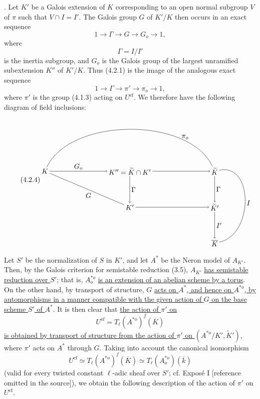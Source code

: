 \medskip
{}. Let $K'$ be a Galois extension of $K$ corresponding to an open
normal subgroup $V$ of $\pi$ such that $V\cap I=I'$.  The Galois group
$G$ of $K'/K$ then occurs in an exact sequence
\begin{equation}\tag{4.2.1}
 1\longrightarrow\Gamma\longrightarrow G\longrightarrow G_o
 \longrightarrow1,
\end{equation}
where
\begin{equation}\tag{4.2.2}
 \Gamma=I/I'
\end{equation}
is the inertia subgroup, and $G_o$ is the Galois group of the largest
unramified subextension $K''$ of $K'/K$.  Thus (4.2.1) is the image of the
analogous exact sequence
\begin{equation}\tag{4.2.3}
 1\longrightarrow\Gamma\longrightarrow\pi'\longrightarrow\pi_o
 \longrightarrow1,
\end{equation}
where $\pi'$ is the group (4.1.3) acting on $U^{\mathrm{ef}}$.  We
therefore have the following diagram of field inclusions:
\begin{equation}\tag{4.2.4}
\begin{tikzpicture}[baseline=(current bounding box.center),
  every node/.style={inner sep=2pt}]
  \node (K) at (0,0) {$K$};
  \node (Ktwo) at (4.25,0) {$K''=\widetilde K\cap K'$};
  \node (Kt) at (8.5,0) {$\widetilde K$};
  \node (Kp) at (4.25,-1.8) {$K'$};
  \node (Ktp) at (8.5,-1.8) {$\widetilde K'$};
  \node (Kb) at (8.5,-3.6) {$\overline K$};
  \draw[->] (K) -- node[above] {$G_o$} (Ktwo);
  \draw[->] (Ktwo) -- (Kt);
  \draw[->] (Ktwo) -- node[right] {$\Gamma$} (Kp);
  \draw[->] (Kp) -- (Ktp);
  \draw[->] (Kt) -- node[right] {$\Gamma$} (Ktp);
  \draw[->] (Ktp) -- node[right] {$I'$} (Kb);
  \draw[-] (K) -- node[below left,pos=.58] {$G$} (Kp);
  \draw[-] (K) to[out=65,in=115,looseness=.85]
    node[above,pos=.78] {$\pi_o$} (Kt);
  \draw[-] (Kt) to[out=12,in=12,looseness=1.25]
    node[right,pos=.52] {$I$} (Kb);
\end{tikzpicture}
\end{equation}

Let $S'$ be the normalization of $S$ in $K'$, and let $A^*$ be the
Neron model of $A_{K'}$.  Then, by the Galois criterion for semistable
reduction (3.5), $A_{K'}$ \underline{has semistable reduction over
$S'$}; that is, $A^{*o}_o$ \underline{is an extension of an abelian
scheme by a torus}.  On the other hand, by transport of structure, $G$
\underline{acts on $A^*$, and hence on $A^{*o}$, by automorphisms in a
manner compatible with the given action of $G$ on the base scheme $S'$
of $A^*$}.  It is then clear that \underline{the action of $\pi'$ on}
\[
 U^{\mathrm{ef}}=T_\ell(A^{*o})^f(\overline K)
\]
\underline{is obtained by transport of structure from the action of
$\pi'$ on $(A^{*o}/K',\widetilde K')$}, where $\pi'$ acts on $A^*$
through $G$.  Taking into account the canonical isomorphism
\begin{equation}\tag{4.2.6}
 U^{\mathrm{ef}}\simeq T_\ell(A^{*o})^f(\overline K)
 \simeq T_\ell(A^{*o}_o)(\overline k)
\end{equation}
(valid for every twisted constant $\ell$-adic sheaf over $S'$; cf.
Expos\'e I [reference omitted in the source]), we obtain the following
description of the action of $\pi'$ on $U^{\mathrm{ef}}$.

